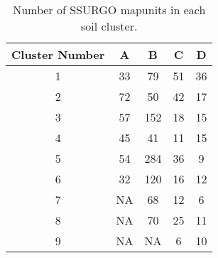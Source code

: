 	\begin{table}[h!]
	\caption[Number of SSURGO mapunits in each soil cluster]{Number of SSURGO mapunits in each soil cluster.}
	\centering
		\begin{tabular}{c c c c c}
			\hline 
			Cluster Number	 & 	A	 & 	B	 & 	C	 & 	D \\
			\hline \hline
			1 & 33	& 79	& 51	& 36  \\
			2 & 72	& 50	& 42	& 17  \\
			3 & 57	& 152	& 18	& 15  \\
			4 & 45	& 41	& 11	& 15  \\
			5 & 54	& 284	& 36	& 9   \\
			6 & 32	& 120	& 16	& 12  \\
			7 & NA	& 68	& 12	& 6   \\
			8 & NA	& 70	& 25	& 11  \\
			9 & NA	& NA  	& 6 	& 10  \\
			\hline		
		\end{tabular}
		
		\label{table:soil_clust}
	\end{table}	